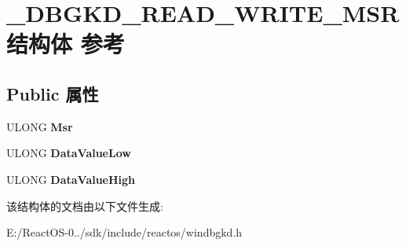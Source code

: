\hypertarget{struct___d_b_g_k_d___r_e_a_d___w_r_i_t_e___m_s_r}{}\section{\+\_\+\+D\+B\+G\+K\+D\+\_\+\+R\+E\+A\+D\+\_\+\+W\+R\+I\+T\+E\+\_\+\+M\+S\+R结构体 参考}
\label{struct___d_b_g_k_d___r_e_a_d___w_r_i_t_e___m_s_r}
\subsection*{Public 属性}
\begin{DoxyCompactItemize}
\item 
\mbox{\label{struct___d_b_g_k_d___r_e_a_d___w_r_i_t_e___m_s_r_a9d242e60904f48b34c4e52e170f90f68}} 
U\+L\+O\+NG {\bfseries Msr}
\item 
\mbox{\label{struct___d_b_g_k_d___r_e_a_d___w_r_i_t_e___m_s_r_a83c03d72045c5241e65c1cfe1f4155f2}} 
U\+L\+O\+NG {\bfseries Data\+Value\+Low}
\item 
\mbox{\label{struct___d_b_g_k_d___r_e_a_d___w_r_i_t_e___m_s_r_ac3c31edf4e742f43025b0e0bdf363e2c}} 
U\+L\+O\+NG {\bfseries Data\+Value\+High}
\end{DoxyCompactItemize}


该结构体的文档由以下文件生成\+:\begin{DoxyCompactItemize}
\item 
E\+:/\+React\+O\+S-\/0../sdk/include/reactos/windbgkd.\+h\end{DoxyCompactItemize}
